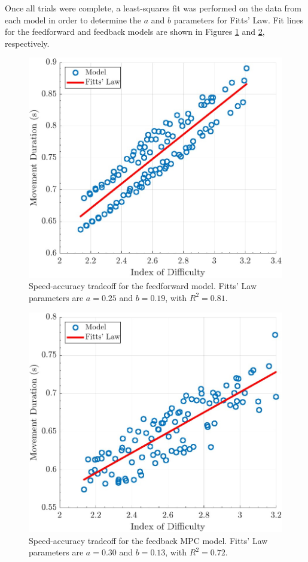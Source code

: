 \documentclass[letterpaper, 10pt, conference]{ieeeconf}
\begin{document}
Once all trials were complete, a least-squares fit was performed on the data from each model in order to determine the $a$ and $b$ parameters for Fitts' Law. Fit lines for the feedforward and feedback models are shown in Figures \ref{fig:FittsLawSingle} and \ref{fig:FittsLawMPC}, respectively.   

\begin{figure}[h]
    \centering
    \includegraphics[width=0.8\linewidth]{images/final_fitts_law_single.jpg}
    \caption{Speed-accuracy tradeoff for the feedforward model. Fitts' Law parameters are $a = 0.25$ and $b = 0.19$, with $R^2 = 0.81$.}
    \label{fig:FittsLawSingle}
\end{figure}

\begin{figure}[h]
    \centering
    \includegraphics[width=0.8\linewidth]{images/final_fitts_law_mpc.jpg}
    \caption{Speed-accuracy tradeoff for the feedback MPC model. Fitts' Law parameters are $a = 0.30$ and $b = 0.13$, with $R^2 = 0.72$.}
    \label{fig:FittsLawMPC}
\end{figure}
\end{document}
